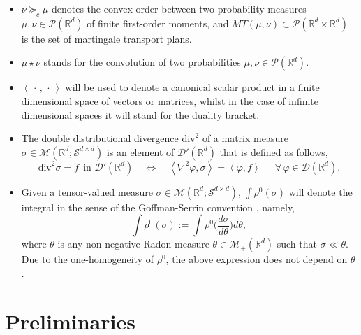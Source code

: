 \documentclass[11pt,letterpaper,reqno]{amsart}
\theoremstyle{definition}
\numberwithin{equation}{section}
\newcommand{\R}{\mathbb{R}}
\newcommand{\Rd}{\R^d}
\newcommand{\argu}{{\,\cdot\,}}
\newcommand{\Mes}{{\mathcal{M}}}
\newcommand{\dive}{{\mathrm{div}}}
\newcommand{\PP}{\mathcal{P}}
\newcommand{\pairing}[1]{{\left \langle #1 \right \rangle}}
\newcommand{\D}{\mathcal{D}}
\newcommand{\Sdd}{{\mathcal{S}^{d \times d}}}
\begin{document}
\begin{itemize}[leftmargin=1.2\parindent]
\item $\nu \succeq_c \mu$ denotes the convex order between  two probability measures $\mu,\nu\in \PP(\Rd)$ of finite first-order moments, and $MT(\mu,\nu) \subset \PP(\Rd \times \Rd)$ is the set of martingale transport plans.

\item $\mu \star \nu$ stands for the convolution of two probabilities  $\mu,\nu\in \PP(\Rd)$.


\item  $\pairing{\argu,\argu}$ will be used to denote a canonical scalar product in a finite dimensional space of vectors or matrices, whilst in the case of infinite dimensional spaces it will stand for the  duality bracket.


\item  The double distributional divergence $\dive^2$ of a matrix measure  $\sigma \in \Mes(\Rd;\Sdd)$  is an element of $\D'(\Rd)$ that is defined as follows,
\begin{equation*}
    \dive^2 \sigma = f \ \ \text{in \ } \D'(\Rd) \quad \Leftrightarrow \quad {\pairing{\nabla^2 \varphi, \sigma} }= \pairing{\varphi,f} \quad \ \ \forall\,\varphi \in \D(\Rd).
\end{equation*}


\item  Given a tensor-valued measure $\sigma\in \Mes(\R^d;\Sdd)$,  $\int \rho^0(\sigma)$ will denote 
 the  integral in the sense of the Goffman-Serrin convention \cite{Goffman}, namely,
 \begin{equation*}
    \int \rho^0(\sigma) := \int  \rho^0\! \Big(\frac{d \sigma}{d \theta}\Big) d\theta,
\end{equation*}
where $\theta$ is any non-negative Radon measure $\theta\in \Mes_+(\R^d)$ such that $\sigma \ll \theta$.
Due to the one-homogeneity of $\rho^0$, the above expression does not depend on $\theta$.
\end{itemize}
	
 

\bigskip
\section{Preliminaries}\label{Prelim}
\end{document}
